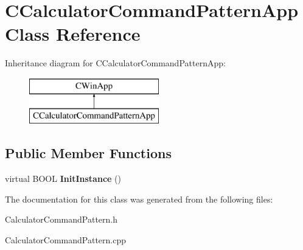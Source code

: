 \hypertarget{class_c_calculator_command_pattern_app}{}\section{C\+Calculator\+Command\+Pattern\+App Class Reference}
\label{class_c_calculator_command_pattern_app}
Inheritance diagram for C\+Calculator\+Command\+Pattern\+App\+:\begin{figure}[H]
\begin{center}
\leavevmode
\includegraphics[height=2.000000cm]{class_c_calculator_command_pattern_app}
\end{center}
\end{figure}
\subsection*{Public Member Functions}
\begin{DoxyCompactItemize}
\item 
\hypertarget{class_c_calculator_command_pattern_app_aa7bcd7b39fd69d926dabf5d73e5f598b}{}virtual B\+O\+O\+L {\bfseries Init\+Instance} ()\label{class_c_calculator_command_pattern_app_aa7bcd7b39fd69d926dabf5d73e5f598b}

\end{DoxyCompactItemize}


The documentation for this class was generated from the following files\+:\begin{DoxyCompactItemize}
\item 
Calculator\+Command\+Pattern.\+h\item 
Calculator\+Command\+Pattern.\+cpp\end{DoxyCompactItemize}
